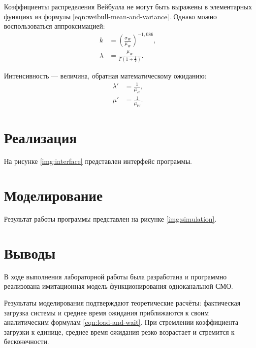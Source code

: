 \documentclass[a4paper, 14pt]{extreport}
\begin{document}
\begin{MainPart}
Коэффициенты распределения Вейбулла не могут быть выражены в элементарных функциях из формулы \eqref{eqn:weibull-mean-and-variance}.
Однако можно воспользоваться аппроксимацией:
\begin{equation}
	\begin{aligned}
		k       &= \left(\frac{\sigma_W}{\mu_W}\right)^{-1,086}, \\
		\lambda &= \frac{\mu_W}{\Gamma{\left(1 + \frac1k\right)}}.
	\end{aligned}
\end{equation}

Интенсивность — величина, обратная математическому ожиданию:
\begin{equation}
	\begin{aligned}
		\lambda' &= \frac{1}{\mu_R}, \\
		\mu'     &= \frac{1}{\mu_W}.
	\end{aligned}
\end{equation}

\section{Реализация}

На рисунке \ref{img:interface} представлен интерфейс программы.


\section{Моделирование}

Результат работы программы представлен на рисунке \ref{img:simulation}.


\section{Выводы}

В ходе выполнения лабораторной работы была разработана и программно реализована имитационная модель функционирования одноканальной СМО.

Результаты моделирования подтверждают теоретические расчёты: фактическая загрузка системы и среднее время ожидания приближаются к своим аналитическим формулам \eqref{eqn:load-and-wait}.
При стремлении коэффициента загрузки к единице, среднее время ожидания резко возрастает и стремится к бесконечности.

\end{MainPart}
\end{document}
